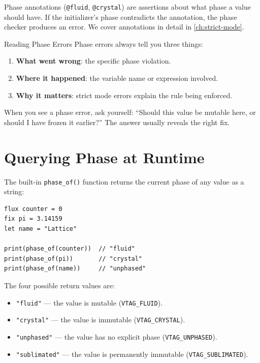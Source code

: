 Phase annotations (\lstinline|@fluid|, \lstinline|@crystal|) are assertions about what phase a value should have.
If the initializer's phase contradicts the annotation, the phase checker produces an error.
We cover annotations in detail in \cref{ch:strict-mode}.

\begin{tipbox}{Reading Phase Errors}
Phase errors always tell you three things:
\begin{enumerate}
  \item \textbf{What went wrong}: the specific phase violation.
  \item \textbf{Where it happened}: the variable name or expression involved.
  \item \textbf{Why it matters}: strict mode errors explain the rule being enforced.
\end{enumerate}
When you see a phase error, ask yourself: ``Should this value be mutable here, or should I have frozen it earlier?''
The answer usually reveals the right fix.
\end{tipbox}


\section{Querying Phase at Runtime}\label{sec:querying-phase}


The built-in \lstinline|phase_of()| function returns the current phase of any value as a string:

\begin{lstlisting}[language=Lattice, caption={Using \texttt{phase\_of()} for runtime inspection}]
flux counter = 0
fix pi = 3.14159
let name = "Lattice"

print(phase_of(counter))  // "fluid"
print(phase_of(pi))       // "crystal"
print(phase_of(name))     // "unphased"
\end{lstlisting}

The four possible return values are:
\begin{itemize}
  \item \lstinline|"fluid"| --- the value is mutable (\lstinline|VTAG_FLUID|).
  \item \lstinline|"crystal"| --- the value is immutable (\lstinline|VTAG_CRYSTAL|).
  \item \lstinline|"unphased"| --- the value has no explicit phase (\lstinline|VTAG_UNPHASED|).
  \item \lstinline|"sublimated"| --- the value is permanently immutable (\lstinline|VTAG_SUBLIMATED|).
\end{itemize}

